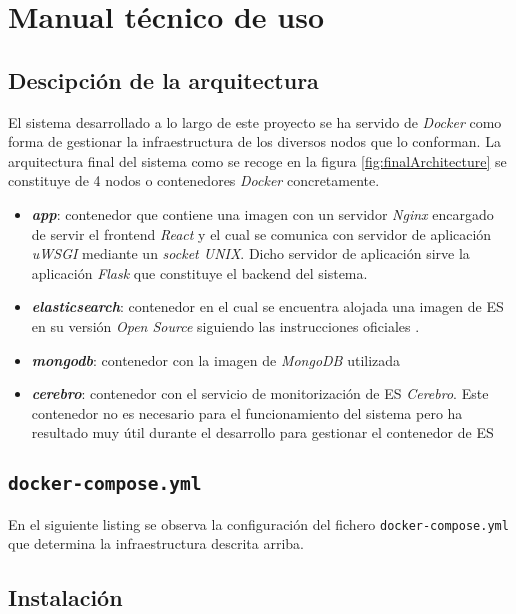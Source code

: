 \chapter{Manual técnico de uso}

\section{Descipción de la arquitectura}
El sistema desarrollado a lo largo de este proyecto se ha servido de \textit{Docker} como forma de gestionar la infraestructura de los diversos nodos que lo conforman. La arquitectura final del sistema como se recoge en la figura \ref{fig:finalArchitecture} se constituye de 4 nodos o contenedores \textit{Docker} concretamente.

\begin{itemize}
	\item \textit{\textbf{app}}: contenedor que contiene una imagen con un servidor \textit{Nginx} encargado de servir el \gls{frontend} \textit{React} y el cual se comunica con servidor de aplicación \textit{uWSGI} mediante un \textit{socket UNIX}. Dicho servidor de aplicación sirve la aplicación \textit{Flask} que constituye el \gls{backend} del sistema.
	\item \textit{\textbf{elasticsearch}}: contenedor en el cual se encuentra alojada una imagen de \acrlong{ES} en su versión \textit{Open Source} siguiendo las instrucciones oficiales \cite{ES_docker}.
	\item \textit{\textbf{mongodb}}: contenedor con la imagen de \textit{MongoDB} utilizada
	\item \textit{\textbf{cerebro}}: contenedor con el servicio de monitorización de \acrshort{ES} \textit{Cerebro}. Este contenedor no es necesario para el funcionamiento del sistema pero ha resultado muy útil durante el desarrollo para gestionar el contenedor de \acrshort{ES}
\end{itemize}

\section{\texttt{docker-compose.yml}}
En el siguiente listing se observa la configuración del fichero \texttt{docker-compose.yml} que determina la infraestructura descrita arriba.



\section{Instalación}
